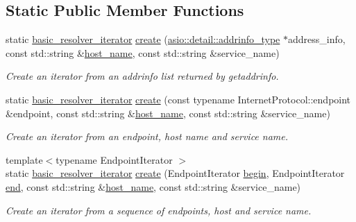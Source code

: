 \subsection*{Static Public Member Functions}
\begin{DoxyCompactItemize}
\item 
static \hyperlink{classasio_1_1ip_1_1basic__resolver__iterator}{basic\+\_\+resolver\+\_\+iterator} \hyperlink{classasio_1_1ip_1_1basic__resolver__iterator_a07c8950163e5fecd4f877ffef27b2261}{create} (\hyperlink{namespaceasio_1_1detail_ad8df56a17e3aa9ce2ad251fb76426e67}{asio\+::detail\+::addrinfo\+\_\+type} $\ast$address\+\_\+info, const std\+::string \&\hyperlink{namespaceasio_1_1ip_a9fb69e400d86dec2d2523bd63a103e76}{host\+\_\+name}, const std\+::string \&service\+\_\+name)
\begin{DoxyCompactList}\small\item\em Create an iterator from an addrinfo list returned by getaddrinfo. \end{DoxyCompactList}\item 
static \hyperlink{classasio_1_1ip_1_1basic__resolver__iterator}{basic\+\_\+resolver\+\_\+iterator} \hyperlink{classasio_1_1ip_1_1basic__resolver__iterator_aa976005ecb96a549b57e6e6fe37c12f1}{create} (const typename Internet\+Protocol\+::endpoint \&endpoint, const std\+::string \&\hyperlink{namespaceasio_1_1ip_a9fb69e400d86dec2d2523bd63a103e76}{host\+\_\+name}, const std\+::string \&service\+\_\+name)
\begin{DoxyCompactList}\small\item\em Create an iterator from an endpoint, host name and service name. \end{DoxyCompactList}\item 
{\footnotesize template$<$typename Endpoint\+Iterator $>$ }\\static \hyperlink{classasio_1_1ip_1_1basic__resolver__iterator}{basic\+\_\+resolver\+\_\+iterator} \hyperlink{classasio_1_1ip_1_1basic__resolver__iterator_ac7d7bea87217a60d8273c5163fb68f7c}{create} (Endpoint\+Iterator \hyperlink{group__async__connect_ga7055bca9225050c030c19c7dc926fa53}{begin}, Endpoint\+Iterator \hyperlink{group__async__connect_gadb6ad0193229ae84828688e812cd325c}{end}, const std\+::string \&\hyperlink{namespaceasio_1_1ip_a9fb69e400d86dec2d2523bd63a103e76}{host\+\_\+name}, const std\+::string \&service\+\_\+name)
\begin{DoxyCompactList}\small\item\em Create an iterator from a sequence of endpoints, host and service name. \end{DoxyCompactList}\end{DoxyCompactItemize}

